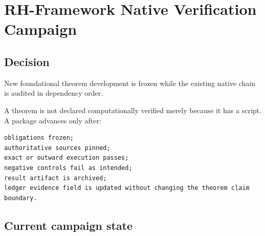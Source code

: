 \hypertarget{rh-framework-native-verification-campaign}{%
\chapter{RH-Framework Native Verification Campaign}\label{rh-framework-native-verification-campaign}}

\hypertarget{decision}{%
\section{Decision}\label{decision}}

New foundational theorem development is frozen while the existing native chain is audited in dependency order.

A theorem is not declared computationally verified merely because it has a script. A package advances only after:

\begin{verbatim}
obligations frozen;
authoritative sources pinned;
exact or outward execution passes;
negative controls fail as intended;
result artifact is archived;
ledger evidence field is updated without changing the theorem claim boundary.
\end{verbatim}

\hypertarget{current-campaign-state}{%
\section{Current campaign state}\label{current-campaign-state}}


